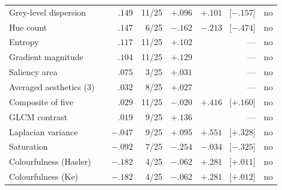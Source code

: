 \begin{table}[!ht]
\begin{tabular}{@{}l l r r r r c@{}}
Grey-level dispersion & \citep{jeong2016static} & $.149$ & 11/25 & $+.096$ & $+.101$ \ \tiny[$-.157$] & no \\
\rowcolor{rowlight}Hue count & \citep{ke2006highlevel} & $.147$ & 6/25 & $-.162$ & $-.213$ \ \tiny[$-.474$] & no \\
Entropy & \citep{qaroush2025diversity} & $.117$ & 11/25 & $+.102$ & --- & no \\
\rowcolor{rowlight}Gradient magnitude & \citep{qaroush2025diversity} & $.104$ & 11/25 & $+.129$ & --- & no \\
Saliency area & \citep{qaroush2025diversity} & $.075$ & 3/25 & $+.031$ & --- & no \\
\rowcolor{rowlight}Averaged aesthetics (3) & \citep{gygli2014summe} & $.032$ & 8/25 & $+.027$ & --- & no \\
Composite of five & \citep{srinivas2016rank} & $.029$ & 11/25 & $-.020$ & $+.416$ \ \tiny[$+.160$] & no \\
\rowcolor{rowlight}GLCM contrast & \citep{yang2024keyframe} & $.019$ & 9/25 & $+.136$ & --- & no \\
Laplacian variance & \citep{cakmak2025tripss} & $-.047$ & 9/25 & $+.095$ & $+.551$ \ \tiny[$+.328$] & no \\
\rowcolor{rowlight}Saturation & \citep{huang2024aesthetic} & $-.092$ & 7/25 & $-.254$ & $-.034$ \ \tiny[$-.325$] & no \\
Colourfulness (Hasler) & \citep{hasler2003colorfulness} & $-.182$ & 4/25 & $-.062$ & $+.281$ \ \tiny[$+.011$] & no \\
\rowcolor{rowlight}Colourfulness (Ke) & \citep{ke2006highlevel} & $-.182$ & 4/25 & $-.062$ & $+.281$ \ \tiny[$+.012$] & no \\
\bottomrule
\end{tabular}
\end{table}
